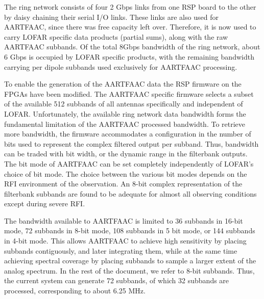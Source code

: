 \documentclass{ws-jai}
\begin{document}
The ring network consists  of four 2 Gbps links from one RSP  board to the other
by  daisy chaining  their  serial I/O  links.   These links  are  also used  for
AARTFAAC, since there was free capacity left over.  Therefore, it is now used to
carry LOFAR specific  data products (partial sums), along with  the raw AARTFAAC
subbands. Of  the total  8Gbps bandwidth of  the ring network,  about 6  Gbps is
occupied by LOFAR  specific products, with the remaining  bandwidth carrying per
dipole subbands used exclusively for AARTFAAC processing.


To enable the generation of the AARTFAAC data the RSP firmware on the FPGAs have
been modified. The AARTFAAC specific firmware  selects a subset of the available
512  subbands   of  all   antennas  specifically   and  independent   of  LOFAR.
Unfortunately, the available  ring network data bandwidth  forms the fundamental
limitation of the AARTFAAC processed bandwidth.  To retrieve more bandwidth, the
firmware accommodates  a configuration in the  number of bits used  to represent
the complex filtered output per subband.  Thus, bandwidth can be traded with bit
width, or the dynamic range in the filterbank outputs.  The bit mode of AARTFAAC
can be  set completely independently of  LOFAR's choice of bit  mode. The choice
between the various bit modes depends on the RFI environment of the observation.
An  8-bit complex  representation of  the filterbank  subbands are  found to  be
adequate for almost all observing conditions except during severe RFI.

The bandwidth available to AARTFAAC is limited to 36 subbands in 16-bit mode, 72
subbands in  8-bit mode, 108 subbands  in 5 bit  mode, or 144 subbands  in 4-bit
mode.   This allows  AARTFAAC to  achieve high  sensitivity by  placing subbands
contiguously,  and later  integrating them,  while  at the  same time  achieving
spectral coverage  by placing subbands to  sample a larger extent  of the analog
spectrum. In the  rest of the document,  we refer to 8-bit  subbands.  Thus, the
current system  can generate 72  subbands, of  which 32 subbands  are processed,
corresponding to about 6.25 MHz.\\
\end{document}
